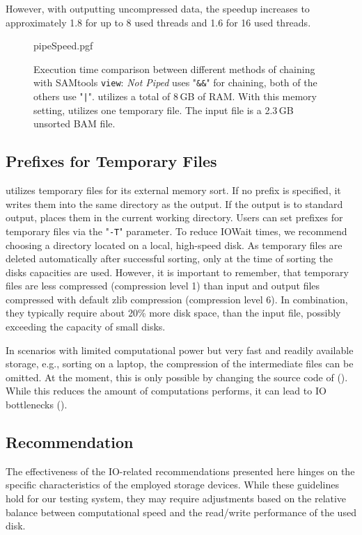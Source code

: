 However, with \sort outputting uncompressed data, the speedup increases to approximately 1.8 for up to 8 used threads and 1.6 for 16 used threads.
\begin{figure}[t]
        {pipeSpeed.pgf}
    \caption{Execution time comparison between different methods of chaining \sort with SAMtools \texttt{view}: \textit{Not Piped} uses "\texttt{\&\&}" for chaining, both of the others use "\texttt{|}". \sort utilizes a total of 8\,GB of RAM. With this memory setting, \sort utilizes one temporary file. \threads \points The input file is a 2.3\,GB unsorted BAM file. 
    }
    \label{fig:pipeSpeeds}
\end{figure}

\subsection{Prefixes for Temporary Files}
 \sort utilizes temporary files for its external memory sort. If no prefix is specified, it writes them into the same directory as the output. If the output is to standard output, \sort places them in the current working directory. Users can set prefixes for temporary files via the "\texttt{-T}" parameter. To reduce IOWait times, we recommend choosing a directory located on a local, high-speed disk. As temporary files are deleted automatically after successful sorting, only at the time of sorting the disks capacities are used. However, it is important to remember, that temporary files are less compressed (compression level 1) than input and output files compressed with default zlib compression (compression level 6). In combination, they typically require about 20\% more disk space, than the input file, possibly exceeding the capacity of small disks.
 
 In scenarios with limited computational power but very fast and readily available storage, e.g., sorting on a laptop, the compression of the intermediate files can be omitted. At the moment, this is only possible by changing the source code of \sort (). While this reduces the amount of computations \sort performs, it can lead to IO bottlenecks ().

\subsection{Recommendation}
The effectiveness of the IO-related recommendations presented here hinges on the specific characteristics of the employed storage devices. While these guidelines hold for our testing system, they may require adjustments based on the relative balance between computational speed and the read/write performance of the used disk.  

